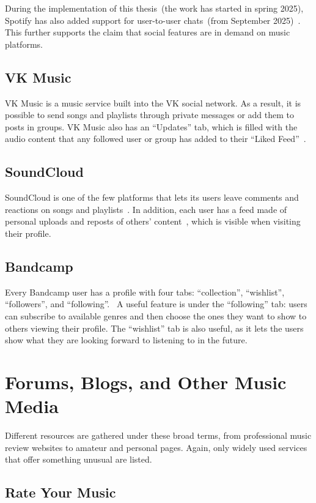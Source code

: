 During the implementation of this thesis~(the work has started in spring 2025),
Spotify has also added support for user-to-user chats~(from September 2025)~\parencite{spotify_chat}.
This further supports the claim that social features are in demand on music platforms.

\subsection{VK Music}
VK Music is a music service built into the VK social network.
As a result, it is possible to send songs and playlists through private messages or add them to
posts in groups.
VK Music also has an ``Updates'' tab, which is filled with the audio content that
any followed user or group has added to their ``Liked Feed''~\parencite{vk_music}.

\subsection{SoundCloud}
SoundCloud is one of the few platforms that lets its users leave comments
and reactions on songs and playlists~\parencite{sc_comments,sc_reactions}.
In addition, each user has a feed made of personal uploads and
reposts of others' content~\parencite{sc_reposts}, which is visible when visiting their profile.

\subsection{Bandcamp}
Every Bandcamp user has a profile with four tabs: ``collection'',
``wishlist'', ``followers'', and ``following''.~\parencite{bandcamp_fans}
A useful feature is under the ``following'' tab: users can subscribe to available genres and then
choose the ones they want to show to others viewing their profile.
The ``wishlist'' tab is also useful,
as it lets the users show what they are looking forward to listening to in the future.


\section{Forums, Blogs, and Other Music Media}
Different resources are gathered under these broad terms, from professional music review websites
to amateur and personal pages.
Again, only widely used services that offer something unusual are listed.

\subsection{Rate Your Music}


